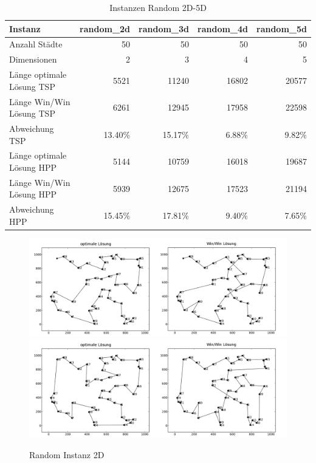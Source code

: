 \documentclass[11pt,a4paper]{article}
\begin{document}
\begin{table}[H]
        \centering
        \begin{tabular}{| l | r | r | r | r |}
            \hline
            Instanz                     & \textbf{random\_2d}
                                        & \textbf{random\_3d}
                                        & \textbf{random\_4d}
                                        & \textbf{random\_5d} \\ \hline
            Anzahl Städte               & 50        & 50        & 50        & 50            \\ \hline
            Dimensionen                 & 2         & 3         & 4         & 5       \\ \hline
            Länge optimale Lösung TSP   & 5521      & 11240     & 16802     & 20577   \\ \hline
            Länge Win/Win Lösung  TSP   & 6261      & 12945     & 17958     & 22598   \\ \hline
            Abweichung TSP              & 13.40\%   & 15.17\%   & 6.88\%    & 9.82\%  \\ \hline
            Länge optimale Lösung HPP   & 5144      & 10759     & 16018     & 19687   \\ \hline
            Länge Win/Win Lösung  HPP   & 5939      & 12675     & 17523     & 21194   \\ \hline
            Abweichung HPP              & 15.45\%   & 17.81\%   & 9.40\%    & 7.65\%  \\ \hline
        \end{tabular}
        \caption{Instanzen Random 2D-5D}
        \label{tab:instanzen_random}
\end{table}

\begin{figure}[H]
    \centering
    \includegraphics[width=16cm]{gfx/random_hpp_comparison}
    \includegraphics[width=16cm]{gfx/random_tsp_comparison}
    \caption{Random Instanz 2D}
    \label{img:random_comparison}
\end{figure}
\end{document}
